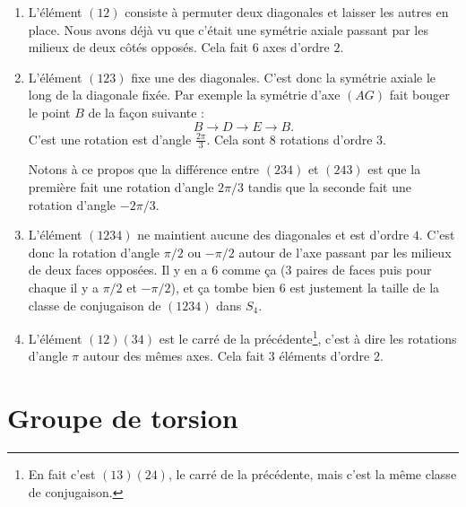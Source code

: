 \begin{enumerate}
    \item
        L'élément \( (12)\) consiste à permuter deux diagonales et laisser les autres en place. Nous avons déjà vu que c'était une symétrie axiale passant par les milieux de deux côtés opposés. Cela fait \( 6\) axes d'ordre \( 2\).
    \item
        L'élément \( (123)\) fixe une des diagonales. C'est donc la symétrie axiale le long de la diagonale fixée. Par exemple la symétrie d'axe \( (AG)\) fait bouger le point \( B\) de la façon suivante :
        \begin{equation}
            B\to D\to E\to B.
        \end{equation}
        C'est une rotation est d'angle \( \frac{ 2\pi }{ 3 }\). Cela sont \( 8\) rotations d'ordre \( 3\).

        Notons à ce propos que la différence entre \( (234)\) et \( (243)\) est que la première fait une rotation d'angle \( 2\pi/3\) tandis que la seconde fait une rotation d'angle \( -2\pi/3\).

    \item
        L'élément \( (1234)\) ne maintient aucune des diagonales et est d'ordre \( 4\). C'est donc la rotation d'angle \( \pi/2\) ou \( -\pi/2\) autour de l'axe passant par les milieux de deux faces opposées. Il y en a \( 6\) comme ça (\( 3\) paires de faces puis pour chaque il y a \( \pi/2\) et \( -\pi/2\)), et ça tombe bien \( 6\) est justement la taille de la classe de conjugaison de \( (1234)\) dans \( S_4\).

    \item
        L'élément \( (12)(34)\) est le carré de la précédente\footnote{En fait c'est \( (13)(24)\), le carré de la précédente, mais c'est la même classe de conjugaison.}, c'est à dire les rotations d'angle \( \pi\) autour des mêmes axes. Cela fait \( 3\) éléments d'ordre \( 2\).
        
\end{enumerate}

\section{Groupe de torsion}

